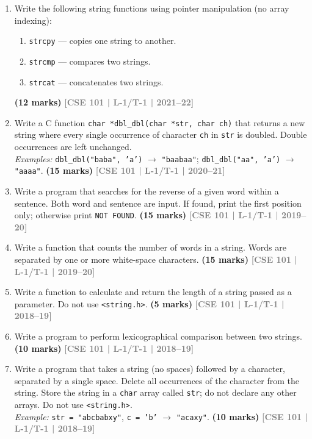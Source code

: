 \documentclass[12pt,a3paper]{article}
\newcommand{\yr}[1]{\hfill\textcolor{gray}{\small\textbf{[#1]}}}
\newcommand{\mk}[1]{\textcolor{orange!70!black}{\small\textbf{(#1 marks)}}}
\begin{document}
\begin{enumerate}
\item Write the following string functions using pointer manipulation (no array indexing):
\begin{enumerate}
  \item \texttt{strcpy} --- copies one string to another.
  \item \texttt{strcmp} --- compares two strings.
  \item \texttt{strcat} --- concatenates two strings.
\end{enumerate}
\mk{12} \yr{CSE 101 | L-1/T-1 | 2021--22}

\item Write a C function \texttt{char *dbl\_dbl(char *str, char ch)} that returns a new string where every single occurrence of character \texttt{ch} in \texttt{str} is doubled. Double occurrences are left unchanged.\\
\textit{Examples:} \texttt{dbl\_dbl("baba", 'a')} $\to$ \texttt{"baabaa"}; \quad \texttt{dbl\_dbl("aa", 'a')} $\to$ \texttt{"aaaa"}.
\mk{15} \yr{CSE 101 | L-1/T-1 | 2020--21}

\item Write a program that searches for the reverse of a given word within a sentence. Both word and sentence are input. If found, print the first position only; otherwise print \texttt{NOT FOUND}.
\mk{15} \yr{CSE 101 | L-1/T-1 | 2019--20}

\item Write a function that counts the number of words in a string. Words are separated by one or more white-space characters.
\mk{15} \yr{CSE 101 | L-1/T-1 | 2019--20}

\item Write a function to calculate and return the length of a string passed as a parameter. Do not use \texttt{<string.h>}.
\mk{5} \yr{CSE 101 | L-1/T-1 | 2018--19}

\item Write a program to perform lexicographical comparison between two strings.
\mk{10} \yr{CSE 101 | L-1/T-1 | 2018--19}

\item Write a program that takes a string (no spaces) followed by a character, separated by a single space. Delete all occurrences of the character from the string. Store the string in a \texttt{char} array called \texttt{str}; do not declare any other arrays. Do not use \texttt{<string.h>}.\\
\textit{Example:} \texttt{str = "abcbabxy"}, \texttt{c = 'b'} $\to$ \texttt{"acaxy"}.
\mk{10} \yr{CSE 101 | L-1/T-1 | 2018--19}


\end{enumerate}
\end{document}
